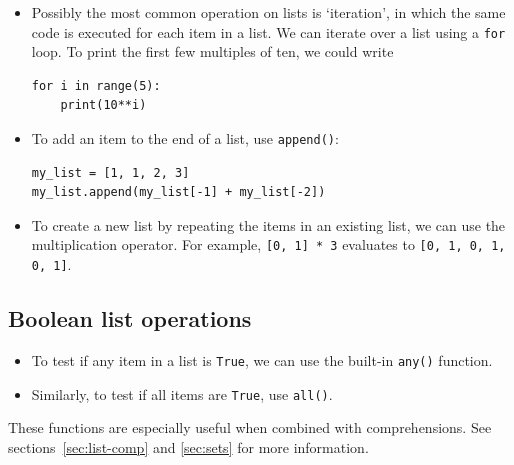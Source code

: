 \documentclass[a4paper,twoside,titlepage]{memoir}
\newcommand{\shellcmd}{\texttt}
\begin{document}
\begin{itemize}
\item Possibly the most common operation on lists is `iteration', in which the same code is executed for each item in a list.  We can iterate over a list using a \shellcmd{for} loop.  To print the first few multiples of ten, we could write
\index{range@\shellcmd{range()}}
\begin{verbatim}
for i in range(5):
	print(10**i)
\end{verbatim}
\item To add an item to the end of a list, use \shellcmd{append()}:
\begin{verbatim}
my_list = [1, 1, 2, 3]
my_list.append(my_list[-1] + my_list[-2])
\end{verbatim}
\item To create a new list by repeating the items in an existing list, we can use the multiplication operator.  For example, \shellcmd{[0, 1] * 3} evaluates to \shellcmd{[0, 1, 0, 1, 0, 1]}.
\end{itemize}

\subsection{Boolean list operations}
\begin{itemize}
\item To test if any item in a list is \shellcmd{True}, we can use the built-in \shellcmd{any()} function.
\item Similarly, to test if all items are \shellcmd{True}, use \shellcmd{all()}.
\end{itemize}
These functions are especially useful when combined with comprehensions.  See sections~\ref{sec:list-comp} and \ref{sec:sets} for more information.
\end{document}

